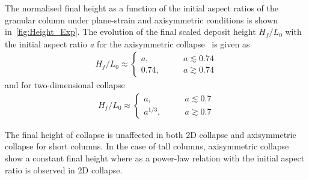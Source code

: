 The normalised final height as a function of the initial aspect ratios of 
the granular column under plane-strain and axisymmetric conditions is 
shown in~\cref{fig:Height_Exp}. The evolution of the final scaled deposit 
height $\textit{H}_{\textit{f}}/\textit{L}_{\textit{0}}$ with the initial 
aspect ratio \textit{a} for the axisymmetric collapse~\citep{Lajeunesse2005} 
is given as 
\begin{align}
\textit{H}_{\textit{f}}/\textit{L}_{\textit{0}} \approx 
\begin{cases}
\textit{a}, \qquad &\textit{a}\lesssim 0.74 \\
0.74, \qquad &\textit{a}\gtrsim 0.74
\end{cases}
\end{align}
and for two-dimensional collapse
\begin{align}
\textit{H}_{\textit{f}}/\textit{L}_{\textit{0}} \approx 
\begin{cases}
\textit{a}, \qquad &\textit{a}\lesssim 0.7 \\
\textit{a}^{1/3}, \qquad &\textit{a}\gtrsim 0.7
\end{cases}
\end{align}

The final height of collapse is unaffected in both 2D collapse and 
axisymmetric collapse for short columns. In the case of tall columns, 
axisymmetric collapse show a constant final height where as a power-law 
relation with the initial aspect ratio is observed in 2D collapse.

